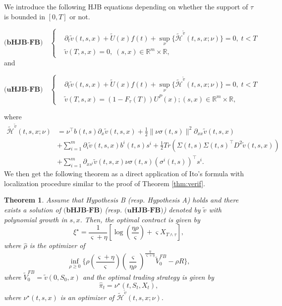 \documentclass[11pt,a4paper]{article}
\theoremstyle{thmstyleone}%
\newtheorem{theorem}{Theorem}%
\theoremstyle{thmstyletwo}%
\theoremstyle{thmstylethree}%
\begin{document}
We introduce the following HJB equations depending on whether the support of $\tau$ is bounded in $[0,T]$ or not.


\[
\textbf{(bHJB-FB)}\quad\begin{cases}
  &  \partial_t \tilde v(t,s,x) + \tilde U(x) f(t) + \sup_{\nu}\bigl \{ \tilde{\mathcal {H}}^{\tilde v}(t,s,x;\nu)\bigl \}=0,\; t<T\\
&\tilde v(T,s,x)=0,\; (s,x)\in \mathbb R^m\times \mathbb R,
\end{cases}
\]
 and

\[
\textbf{(uHJB-FB)}\quad\begin{cases}
  &  \partial_t \tilde v(t,s,x) + \tilde U(x) f(t) + \sup_{\nu}\bigl \{ \tilde{\mathcal {H}}^{\tilde v}(t,s,x;\nu)\bigl \}=0,\; t<T\\
&\tilde v(T,s,x)=(1-F_\tau(T))U^P(x); (s,x)\in \mathbb R^m\times \mathbb R,
\end{cases}
\]

where
\begin{align*}
 \tilde{\mathcal {H}}^{\tilde v}(t,s,x;\nu)&=   \nu^\top b(t,s)\partial_x \tilde v(t,s,x)+\frac12\|\nu\sigma(t,s)\|^2\partial_{xx}\tilde v(t,s,x)\\
 &+\sum_{i=1}^m \partial_i \tilde v(t,s,x) b^i(t,s)s^i+\frac12 Tr(\Sigma(t,s)\Sigma(t,s)^\top D^2\tilde v(t,s,x))\\
 &+\sum_{i=1}^m \partial_{xs^i}\tilde v(t,s,x) \nu \sigma(t,s)(\sigma^i(t,s))^\top s^i.
\end{align*}
We then get the following theorem as a direct application of Ito's formula with localization procedure similar to the proof of Theorem \ref{thm:verif}.
\begin{theorem}
    Assume that Hypothesis B (resp. Hypothesis A) holds and there exists a solution of $\textbf{(bHJB-FB)}$ (resp.  $\textbf{(uHJB-FB)}$) denoted by $\tilde v$ with polynomial growth in $s,x$. Then, the optimal contract is given by 
   \[\xi^\star= \frac1{\varsigma+\eta} [\log(\frac{\eta\rho}\varsigma)+\varsigma X_{T\wedge \tau}],\]
    where $\hat \rho$ is the optimizer of 
    \[\inf_{\rho\geq 0} \big\{ \rho(\frac{\varsigma+\eta}{\varsigma})   (\frac{\varsigma}{\eta\rho})^{\frac\eta{\varsigma+\eta}}\tilde V_0^{FB} -\rho R\Big\},\]
    where $\tilde V_0^{FB}=\tilde v(0,S_0,x)$ and the optimal trading strategy is given by 
    \[\hat\pi_t=\nu^\star(t,S_t,X_t),\]
    where $\nu^\star(t,s,x)$ is an optimizer of $\tilde{\mathcal H}^{\tilde v}(t,s,x;\nu)$.
\end{theorem}
\end{document}
